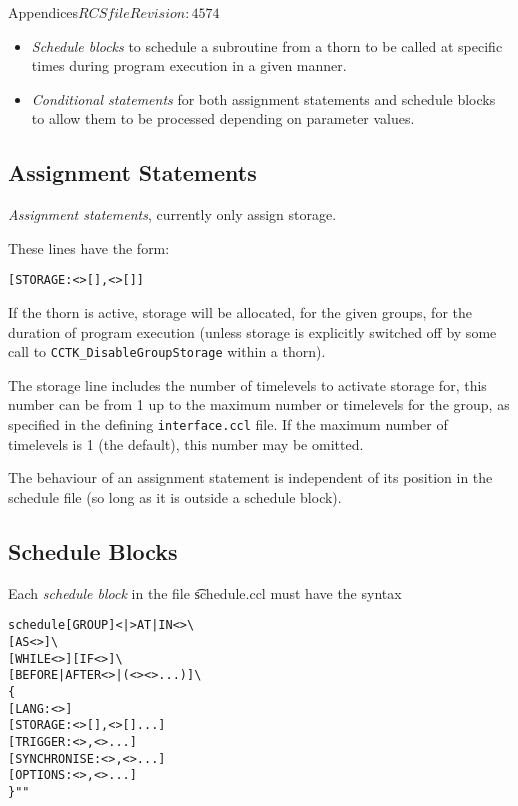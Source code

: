 \begin{cactuspart}{Appendices}{$RCSfile$}{$Revision: 4574 $}
\begin{itemize}
\item{} \textit{Schedule blocks} to schedule a subroutine from a thorn
  to be called at specific times during program execution in a given manner.

\item {} \textit{Conditional statements} for both assignment statements and
  schedule blocks to allow them to be processed depending on parameter values.

\end{itemize}

\subsection{Assignment Statements}

\textit{Assignment statements}, currently only assign storage.

These lines have the form:
\begin{alltt}
[STORAGE: <>[], <>[]]
\end{alltt}

If the thorn is active, storage will be allocated, for the given groups,
for the duration of program execution (unless storage is explicitly
switched off by some call to {\tt CCTK\_DisableGroupStorage} within a
thorn). 

The storage line includes the number of timelevels to activate storage
for, this number can be from 1 up to the maximum number or timelevels
for the group, as specified in the defining {\tt interface.ccl}
file. If the maximum number of timelevels is 1 (the default), this
number may be omitted.

The behaviour of an assignment statement is independent of its
position in the schedule file (so long as it is outside a schedule
block). 

\subsection{Schedule Blocks}

Each \textit{schedule block} in the file {\t schedule.ccl} must have the syntax

\begin{alltt}
schedule [GROUP] <|> AT|IN <> \verb|\|
     [AS <>] \verb|\|
     [WHILE <>] [IF <>] \verb|\|
     [BEFORE|AFTER <>|(<> <> ...)] \verb|\|
\{
  [LANG: <>]
  [STORAGE:       <>[],<>[]...]
  [TRIGGER:       <>,<>...]
  [SYNCHRONISE:   <>,<>...]
  [OPTIONS:       <>,<>...]
\} ""
\end{alltt}


\end{cactuspart}
